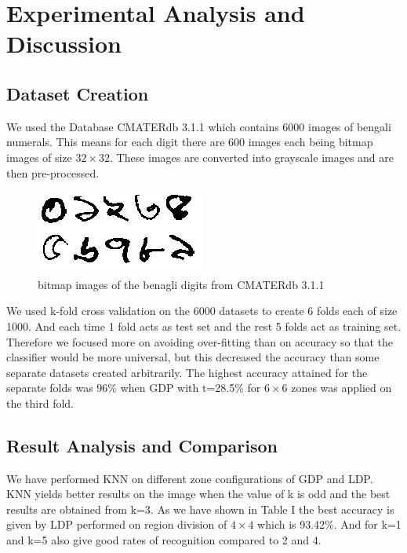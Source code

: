\documentclass[conference]{IEEEtran}
\begin{document}
\section{Experimental Analysis and Discussion}
\subsection{Dataset Creation}
We used the Database CMATERdb 3.1.1 \cite{cmater} which contains 6000 images of bengali numerals. This means for each digit there are 600 images each being bitmap images of size $32 \times 32$. These images are converted into grayscale images and are then pre-processed.
\begin{figure}
	\includegraphics[width=\linewidth]{digits.png}
	\caption{bitmap images of the benagli digits from CMATERdb 3.1.1}
	\label{fig:bangladigits}
\end{figure}

We used k-fold cross validation on the 6000 datasets to create 6 folds each of size 1000. And each time 1 fold acts as test set and the rest 5 folds act as training set. Therefore we focused more on avoiding over-fitting than on accuracy so that the classifier would be more universal, but this decreased the accuracy than some separate datasets created arbitrarily. The highest accuracy attained for the separate folds was 96\% when GDP with t=28.5\% for $6\times6$ zones was applied on the third fold.
\subsection{Result Analysis and Comparison}
We have performed KNN on different zone configurations of GDP and LDP. KNN yields better results on the image when the value of k is odd and the best results are obtained from k=3. As we have shown in Table I the best accuracy is given by LDP performed on region division of $4 \times 4$ which is 93.42\%.
And for k=1 and k=5 also give good rates of recognition compared to 2 and 4.
\end{document}

